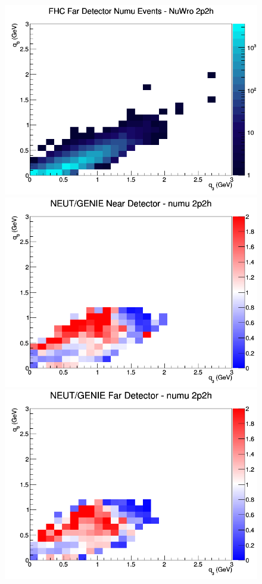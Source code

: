 \begin{figure}[h]
\endminipage
{}
\includegraphics[width=\linewidth]{eff_q0_q3/GAr/2p2h_FHC_FD_numu_q3_q0_NuWro.png}
\endminipage
\newline
{}
\includegraphics[width=\linewidth]{eff_q0_q3/GAr/ratios/2p2h_NEUT_GENIE_numu_near_q3_q0.png}
\endminipage
{}
\includegraphics[width=\linewidth]{eff_q0_q3/GAr/ratios/2p2h_NEUT_GENIE_numu_far_q3_q0.png}

\end{figure}
